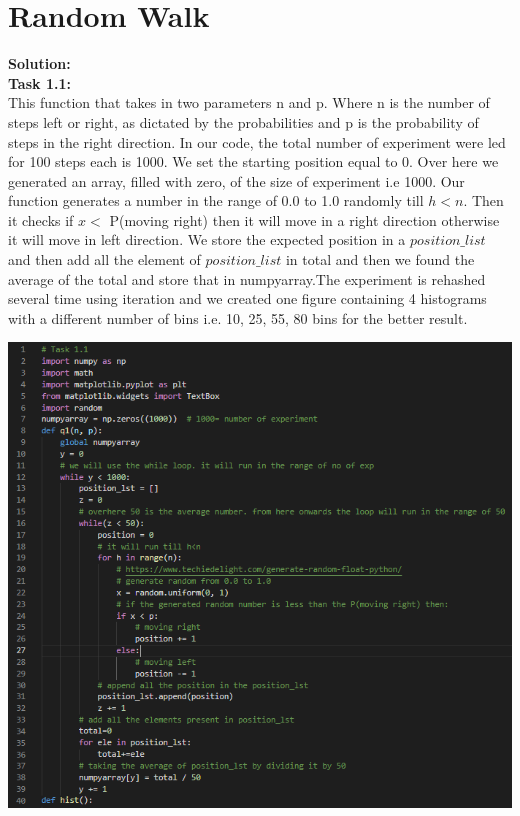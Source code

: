 \documentclass[answers]{exam}
\begin{document}
\section{Random Walk}
\begin{framed}

\textbf{Solution:\\}
\textbf{Task 1.1:\\}
This function that takes in two parameters n and p. Where n is the number of steps left or right, as dictated by the probabilities and p is the probability of steps in the right direction. In our code, the total number of experiment were led for 100 steps each is 1000. We set the starting position equal to 0. Over here we generated an array, filled with zero, of the size of experiment i.e 1000. Our function generates a number in the range of 0.0 to 1.0 randomly till $h<n$. Then it checks if $x <$ P(moving right) then it will move in a right direction otherwise it will move in left direction. We store the expected position in a $position\_list$ and then add all the element of $position\_list$ in total and then we found the average of the total and store that in numpyarray.The experiment is rehashed several time using iteration and we created one figure containing 4 histograms with a different number of bins i.e. 10, 25, 55, 80 bins for the better result.\\
\begin{center}
    \includegraphics[scale=0.7]{task1.1a.PNG}\\

\end{center}
\end{framed}
\end{document}
